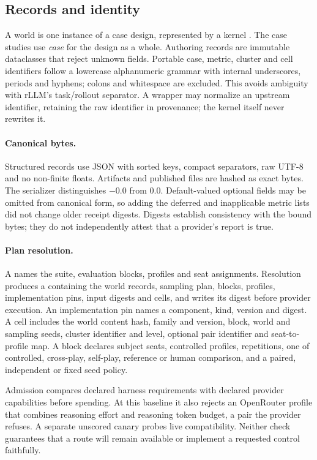 \subsection{Records and identity}
\label{app:runtime-records}

A world is one instance of a case design, represented by a kernel
. The case studies use \emph{case} for the design as
a whole. Authoring records are immutable dataclasses that reject unknown fields.
Portable case, metric, cluster and cell identifiers follow a lowercase
alphanumeric grammar with internal underscores, periods and hyphens;
colons and whitespace are excluded. This avoids ambiguity with rLLM's
task/rollout separator. A wrapper may normalize an upstream identifier,
retaining the raw identifier in provenance; the kernel itself never
rewrites it.

\paragraph{Canonical bytes.}
Structured records use JSON with sorted keys, compact separators, raw
UTF-8 and no non-finite floats. Artifacts and published files are hashed
as exact bytes. The serializer distinguishes $-0.0$ from $0.0$.
Default-valued optional fields may be omitted from canonical form, so
adding the deferred and inapplicable metric lists did not change older
receipt digests. Digests establish consistency with the bound bytes;
they do not independently attest that a provider's report is true.

\paragraph{Plan resolution.}
A  names the suite, evaluation blocks, profiles and seat
assignments. Resolution produces a  containing the world
records, sampling plan, blocks, profiles, implementation pins, input
digests and cells, and writes its digest before provider execution.
An implementation pin names a component, kind, version and digest.
A cell includes the world content hash, family and version, block,
world and sampling seeds, cluster identifier and level, optional pair
identifier and seat-to-profile map. A block declares subject seats,
controlled profiles, repetitions, one of controlled, cross-play,
self-play, reference or human comparison, and a paired, independent or
fixed seed policy.

Admission compares declared harness requirements with declared provider
capabilities before spending. At this baseline it also rejects an
OpenRouter profile that combines reasoning effort and reasoning token
budget, a pair the provider refuses. A separate unscored canary probes
live compatibility. Neither check guarantees that a route will remain
available or implement a requested control faithfully.

